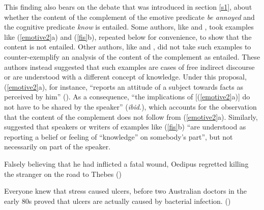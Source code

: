 \documentclass[11pt,fleqn]{article}
\newcommand{\6}{\mbox{$[\hspace*{-.6mm}[$}}
\newcommand{\9}{\mbox{$]\hspace*{-.6mm}]$}}
\begin{document}
{This finding also bears on the debate that was introduced in section \ref{s1}, about whether the content of the complement of the emotive predicate {\em be annoyed} and the cognitive predicate {\em know} is entailed. Some authors, like \citet{klein1975,giannakidou1998,schlenker2003} and \citet{egre2008}, took examples like (\ref{emotive2}a) and (\ref{fis}b), repeated below for convenience, to show that the content is not entailed. Other authors, like \citet{gazdar79a} and \citet{abrusan2011}, did not take such examples to counter-exemplify an analysis of the content of the complement as entailed. These authors instead suggested that such examples are cases of free indirect discourse or are understood with a different concept of knowledge. Under this proposal, (\ref{emotive2}a), for instance, ``reports an attitude of a subject towards facts as perceived by him'' (\citealt[514]{abrusan2011}). As a consequence, ``the implications of [(\ref{emotive2}a)] do not have to be shared by the speaker''  ({\em ibid.}), which accounts for the observation that the content of the complement does not follow from (\ref{emotive2}a). Similarly, \citet[515]{abrusan2011} suggested that speakers or writers of examples like (\ref{fis}b) ``are understood as reporting a belief or feeling of ``knowledge'' on somebody's part'', but not necessarily on part of the speaker. 

\begin{exe}

 Falsely believing that he had inflicted a fatal wound, Oedipus regretted killing the stranger on the road to Thebes \hfill (\citealt{klein1975})

 Everyone knew that stress caused ulcers, before two Australian doctors in the early 80s proved that ulcers are actually caused by bacterial infection. \hfill (\citealt[501]{hazlett2010})


\end{exe}}
\end{document}

